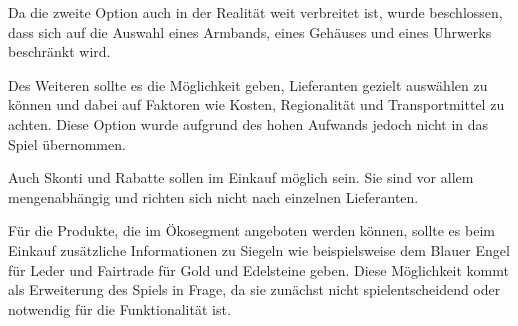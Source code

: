 Da die zweite Option auch in der Realität weit verbreitet ist, wurde beschlossen, dass sich auf die Auswahl eines Armbands, eines Gehäuses und eines Uhrwerks beschränkt wird.

Des Weiteren sollte es die Möglichkeit geben, Lieferanten gezielt auswählen zu können und dabei auf Faktoren wie Kosten, Regionalität und Transportmittel zu achten.
Diese Option wurde aufgrund des hohen Aufwands jedoch nicht in das Spiel übernommen.

Auch Skonti und Rabatte sollen im Einkauf möglich sein. Sie sind vor allem mengenabhängig und richten sich nicht nach einzelnen Lieferanten.

Für die Produkte, die im Ökosegment angeboten werden können, sollte es beim Einkauf zusätzliche Informationen zu Siegeln wie beispielsweise dem Blauer Engel für Leder und Fairtrade für Gold und Edelsteine geben.
Diese Möglichkeit kommt als Erweiterung des Spiels in Frage, da sie zunächst nicht spielentscheidend oder notwendig für die Funktionalität ist.

